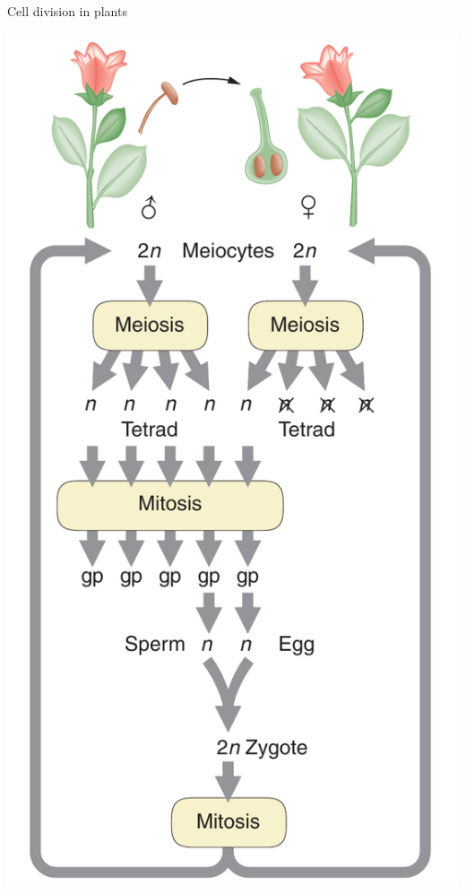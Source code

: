 \documentclass[11pt,ignorenonframetext,aspectratio=169]{beamer}
\begin{document}
\begin{frame}{Cell division in plants}
\protect\hypertarget{cell-division-in-plants}{}
\begin{center}\includegraphics[width=0.28\linewidth]{../images/cell_division_plants} \end{center}
\end{frame}
\end{document}
